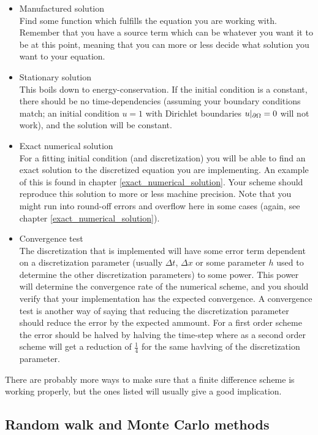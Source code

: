 \begin{itemize}
 \item Manufactured solution\\
 Find some function which fulfills the equation you are working with. Remember that you have a source term which can be whatever you want it to be at this point, meaning that you can more or less decide what solution you want to your equation. 
 \item Stationary solution\\
 This boils down to energy-conservation. If the initial condition is a constant, there should be no time-dependencies (assuming your boundary conditions match; an initial condition $u=1$ with Dirichlet boundaries $u|_{\partial \Omega}=0$ will not work), and the solution will be constant.
 \item Exact numerical solution\\
 For a fitting initial condition (and discretization) you will be able to find an exact solution to the discretized equation you are implementing. An example of this is found in chapter \ref{exact_numerical_solution}. Your scheme should reproduce this solution to more or less machine precision. Note that you might run into round-off errors and overflow here in some cases (again, see chapter \ref{exact_numerical_solution}).\\
 \item Convergence test\\
 The discretization that is implemented will have some error term dependent on a discretization parameter (usually $\Delta t$, $\Delta x$ or some parameter $h$ used to determine the other discretization parameters) to some power. This power will determine the convergence rate of the numerical scheme, and you should verify that your implementation has the expected convergence. A convergence test is another way of saying that reducing the discretization parameter should reduce the error by the expected ammount. For a first order scheme the error should be halved by halving the time-step where as a second order scheme will get a reduction of $\frac{1}{4}$ for the same havlving of the discretization parameter. 
\end{itemize}

There are probably more ways to make sure that a finite difference scheme is working properly, but the ones listed will usually give a good implication.

\subsection{Random walk and Monte Carlo methods}

